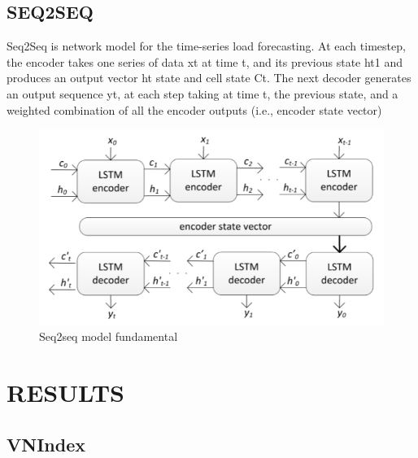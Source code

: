 \documentclass{ieeeojies}
\begin{document}
\subsection{SEQ2SEQ}
Seq2Seq is network model for the time-series load forecasting. At each timestep, the encoder takes one series of data xt at time t, and its previous state ht1 and produces an output vector ht state and cell state Ct. The next decoder generates an output sequence yt, at each step taking at time t, the previous state, and a weighted combination of all the encoder outputs (i.e., encoder state vector) \cite{a4}
\begin{figure}[H]
    \centering
    \includegraphics[width=0.8\linewidth]{Seq2seq.PNG}
    \caption{Seq2seq model fundamental}
    \label{fig:example}
\end{figure}

\section{RESULTS}

\subsection{VNIndex}
\end{document}
